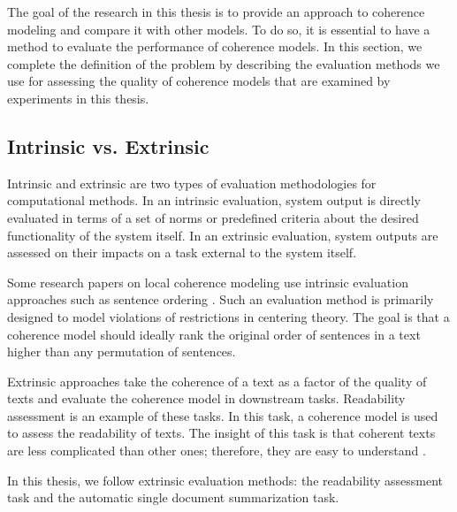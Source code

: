 The goal of the research in this thesis is to provide an approach to coherence modeling and compare it with other models. 
To do so, it is essential to have a method to evaluate the performance of coherence models. 
In this section, we complete the definition of the problem by describing the evaluation methods we use for assessing the quality of coherence models that are examined by experiments in this thesis.  

\subsection{Intrinsic vs. Extrinsic}

Intrinsic and extrinsic are two types of evaluation methodologies for computational methods.  
In an intrinsic evaluation, system output is directly evaluated in terms of a set of norms or predefined criteria about the desired functionality of the system itself. 
In an extrinsic evaluation, system outputs are assessed on their impacts on a task external to the system itself. 

Some research papers on local coherence modeling use intrinsic evaluation approaches such as sentence ordering \cite{karamanis04a,barzilay04}. 
Such an evaluation method \cite{karamanis04a} is primarily designed to model violations of restrictions in centering theory. 
The goal is that a coherence model should ideally rank the original order of sentences in a text higher than any permutation of sentences. 

Extrinsic approaches take the coherence of a text as a factor of the quality of texts and evaluate the coherence model in downstream tasks. 
Readability assessment \cite{pitler08} is an example of these tasks. 
In this task, a coherence model is used to assess the readability of texts.
The insight of this task is that coherent texts are less complicated than other ones; therefore, they are easy to understand \cite{pitler08}. 

In this thesis, we follow extrinsic evaluation methods: the readability assessment task and the automatic single document summarization task.  

